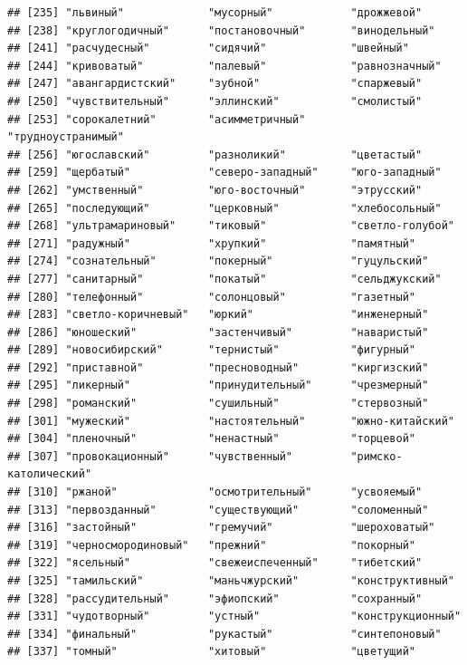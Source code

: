 \documentclass[11pt]{article}\usepackage[]{graphicx}\usepackage[]{color}
\makeatletter
\newenvironment{kframe}{%
 \def\at@end@of@kframe{}%
 \ifinner\ifhmode%
  \def\at@end@of@kframe{\end{minipage}}%
  \begin{minipage}{\columnwidth}%
 \fi\fi%
 \def\FrameCommand##1{\hskip\@totalleftmargin \hskip-\fboxsep
 \colorbox{shadecolor}{##1}\hskip-\fboxsep
     \hskip-\linewidth \hskip-\@totalleftmargin \hskip\columnwidth}%
 \MakeFramed {\advance\hsize-\width
   \@totalleftmargin\z@ \linewidth\hsize
   \@setminipage}}%
 {\par\unskip\endMakeFramed%
 \at@end@of@kframe}
\newenvironment{knitrout}{}{} %
\makeatother
\begin{document}
\begin{knitrout}
\begin{kframe}
\begin{verbatim}
## [235] "львиный"             "мусорный"            "дрожжевой"          
## [238] "круглогодичный"      "постановочный"       "винодельный"        
## [241] "расчудесный"         "сидячий"             "швейный"            
## [244] "кривоватый"          "палевый"             "равнозначный"       
## [247] "авангардистский"     "зубной"              "спаржевый"          
## [250] "чувствительный"      "эллинский"           "смолистый"          
## [253] "сорокалетний"        "асимметричный"       "трудноустранимый"   
## [256] "югославский"         "разноликий"          "цветастый"          
## [259] "щербатый"            "северо-западный"     "юго-западный"       
## [262] "умственный"          "юго-восточный"       "этрусский"          
## [265] "последующий"         "церковный"           "хлебосольный"       
## [268] "ультрамариновый"     "тиковый"             "светло-голубой"     
## [271] "радужный"            "хрупкий"             "памятный"           
## [274] "сознательный"        "покерный"            "гуцульский"         
## [277] "санитарный"          "покатый"             "сельджукский"       
## [280] "телефонный"          "солонцовый"          "газетный"           
## [283] "светло-коричневый"   "юркий"               "инженерный"         
## [286] "юношеский"           "застенчивый"         "наваристый"         
## [289] "новосибирский"       "тернистый"           "фигурный"           
## [292] "приставной"          "пресноводный"        "киргизский"         
## [295] "ликерный"            "принудительный"      "чрезмерный"         
## [298] "романский"           "сушильный"           "стервозный"         
## [301] "мужеский"            "настоятельный"       "южно-китайский"     
## [304] "пленочный"           "ненастный"           "торцевой"           
## [307] "провокационный"      "чувственный"         "римско-католический"
## [310] "ржаной"              "осмотрительный"      "усвояемый"          
## [313] "первозданный"        "существующий"        "соломенный"         
## [316] "застойный"           "гремучий"            "шероховатый"        
## [319] "черносмородиновый"   "прежний"             "покорный"           
## [322] "ясельный"            "свежеиспеченный"     "тибетский"          
## [325] "тамильский"          "маньчжурский"        "конструктивный"     
## [328] "рассудительный"      "эфиопский"           "сохранный"          
## [331] "чудотворный"         "устный"              "конструкционный"    
## [334] "финальный"           "рукастый"            "синтепоновый"       
## [337] "томный"              "хитовый"             "цветущий"           

\end{verbatim}
\end{kframe}
\end{knitrout}
\end{document}
